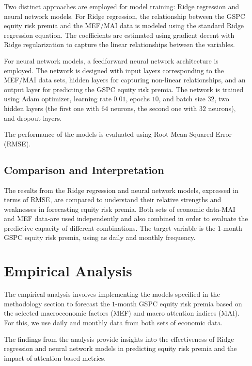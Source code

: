 \documentclass{article}
\begin{document}
Two distinct approaches are employed for model training: Ridge regression and neural network models. For Ridge regression, the relationship between the GSPC equity risk premia and the MEF/MAI data is modeled using the standard Ridge regression equation. The coefficients are estimated using gradient decent with Ridge regularization to capture the linear relationships between the variables.

For neural network models, a feedforward neural network architecture is employed. The network is designed with input layers corresponding to the MEF/MAI data sets, hidden layers for capturing non-linear relationships, and an output layer for predicting the GSPC equity risk premia. The network is trained using Adam optimizer, learning rate $0.01$, epochs $10$, and batch size $32$, two hidden layers (the first one with $64$ neurons, the second one with $32$ neurons), and dropout layers.

The performance of the models is evaluated using Root Mean Squared Error (RMSE).

\subsection{Comparison and Interpretation}

The results from the Ridge regression and neural network models, expressed in terms of RMSE, are compared to understand their relative strengths and weaknesses in forecasting equity risk premia. Both sets of economic data-MAI and MEF data-are used independently and also combined in order to evaluate the predictive capacity of different combinations. The target variable is the $1$-month GSPC equity risk premia, using as daily and monthly frequency.

\section{Empirical Analysis}

The empirical analysis involves implementing the models specified in the methodology section to forecast the $1$-month GSPC equity risk premia based on the selected macroeconomic factors (MEF) and macro attention indices (MAI). For this, we use daily and monthly data from both sets of economic data.

The findings from the analysis provide insights into the effectiveness of Ridge regression and neural network models in predicting equity risk premia and the impact of attention-based metrics.
\end{document}
